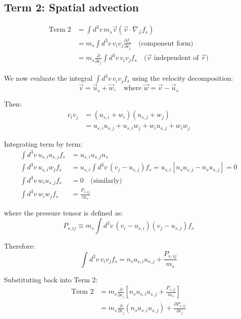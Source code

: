 \subsection{Term 2: Spatial advection}

\begin{align*}
\text{Term 2} &= \int d^3v \, m_s \vec{v} (\vec{v} \cdot \nabla_{\vec{r}} f_s)  \\
&= m_s \int d^3v \, v_i v_j \frac{\partial f_s}{\partial r_j} \quad \text{(component form)}  \\
&= m_s \frac{\partial}{\partial r_j} \int d^3v \, v_i v_j f_s \quad \text{($\vec{v}$ independent of $\vec{r}$)}
\end{align*}

We now evaluate the integral $\int d^3v \, v_i v_j f_s$ using the velocity decomposition:
\begin{equation*}
\vec{v} = \vec{u}_s + \vec{w}, \quad \text{where } \vec{w} = \vec{v} - \vec{u}_s
\end{equation*}

Then:
\begin{align*}
v_i v_j &= (u_{s,i} + w_i)(u_{s,j} + w_j)  \\
&= u_{s,i} u_{s,j} + u_{s,i} w_j + w_i u_{s,j} + w_i w_j
\end{align*}

Integrating term by term:
\begin{align*}
\int d^3v \, u_{s,i} u_{s,j} f_s &= u_{s,i} u_{s,j} n_s \\
\int d^3v \, u_{s,i} w_j f_s &= u_{s,i} \int d^3v \, (v_j - u_{s,j}) f_s = u_{s,i}[n_s u_{s,j} - n_s u_{s,j}] = 0 \\
\int d^3v \, w_i u_{s,j} f_s &= 0 \quad \text{(similarly)} \\
\int d^3v \, w_i w_j f_s &= \frac{P_{s,ij}}{m_s}
\end{align*}

where the pressure tensor is defined as:
\begin{equation*}
P_{s,ij} \equiv m_s \int d^3v \, (v_i - u_{s,i})(v_j - u_{s,j}) f_s
\end{equation*}

Therefore:
\begin{equation*}
\int d^3v \, v_i v_j f_s = n_s u_{s,i} u_{s,j} + \frac{P_{s,ij}}{m_s}
\end{equation*}

Substituting back into Term 2:
\begin{align*}
\text{Term 2} &= m_s \frac{\partial}{\partial r_j} \left[ n_s u_{s,i} u_{s,j} + \frac{P_{s,ij}}{m_s} \right]  \\
&= m_s \frac{\partial}{\partial r_j} (n_s u_{s,i} u_{s,j}) + \frac{\partial P_{s,ij}}{\partial r_j}
\end{align*}

